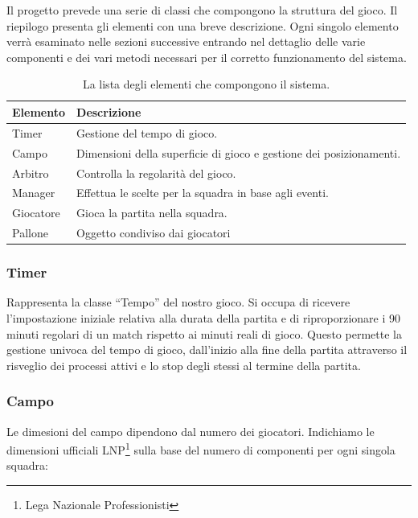 \documentclass[aps,letterpaper,10pt]{article}
\begin{document}
Il progetto prevede una serie di classi che compongono la struttura del gioco. Il riepilogo presenta gli elementi con
una breve descrizione. Ogni singolo elemento verr\`a esaminato nelle sezioni successive entrando nel dettaglio delle
varie componenti e dei vari metodi necessari per il corretto funzionamento del sistema.

\begin{table}[H]
\begin{center}
	\begin{tabular}{|l|l|}
		\hline
		\textbf{Elemento} & \textbf{Descrizione} \\ \hline \hline
		Timer & Gestione del tempo di gioco. \\ \hline
		Campo & Dimensioni della superficie di gioco e gestione dei posizionamenti. \\ \hline
		Arbitro & Controlla la regolarit\`a del gioco. \\ \hline
		Manager & Effettua le scelte per la squadra in base agli eventi. \\ \hline
		Giocatore & Gioca la partita nella squadra. \\ \hline
		Pallone & Oggetto condiviso dai giocatori \\ \hline
		\end{tabular}
\end{center}
\caption{La lista degli elementi che compongono il sistema.}
\end{table}

\subsubsection{Timer}

Rappresenta la classe ``Tempo'' del nostro gioco. Si occupa di ricevere l'impostazione iniziale relativa alla durata
della partita e di riproporzionare i 90 minuti regolari di un match rispetto ai minuti reali di gioco. Questo permette
la gestione univoca del tempo di gioco, dall'inizio alla fine della partita attraverso il risveglio dei processi attivi
e lo stop degli stessi al termine della partita.

\subsubsection{Campo}

Le dimesioni del campo dipendono dal numero dei giocatori. Indichiamo le dimensioni ufficiali LNP\footnote{Lega Nazionale Professionisti} sulla base del numero di componenti per ogni singola squadra:
\end{document}
